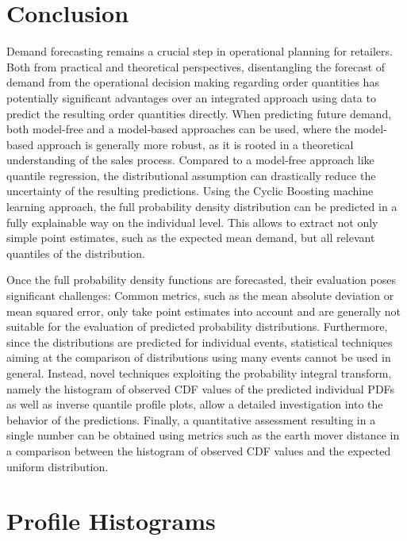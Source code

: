 \documentclass[BCOR=1mm, DIV=calc,10pt,
twoside=true,
twocolumn,
headings=normal]{scrartcl}
\begin{document}
\section{Conclusion}
Demand forecasting remains a crucial step in operational planning for retailers. Both from practical and theoretical perspectives, disentangling the forecast of demand from the operational decision making regarding order quantities has potentially significant advantages over an integrated approach using data to predict the resulting order quantities directly. When predicting future demand, both model-free and a model-based approaches can be used, where the model-based approach is generally more robust, as it is rooted in a theoretical understanding of the sales process. Compared to a model-free approach like quantile regression, the distributional assumption can drastically reduce the uncertainty of the resulting predictions. Using the Cyclic Boosting machine learning approach, the full probability density distribution can be predicted in a fully explainable way on the individual level. This allows to extract not only simple point estimates, such as the expected mean demand, but all relevant quantiles of the distribution.

Once the full probability density functions are forecasted, their evaluation poses significant challenges: Common metrics, such as the mean absolute deviation or mean squared error, only take point estimates into account and are generally not suitable for the evaluation of predicted probability distributions. Furthermore, since the distributions are predicted for individual events, statistical techniques aiming at the comparison of distributions using many events cannot be used in general. Instead, novel techniques exploiting the probability integral transform, namely the histogram of observed CDF values of the predicted individual PDFs as well as inverse quantile profile plots, allow a detailed investigation into the behavior of the predictions. Finally, a quantitative assessment resulting in a single number can be obtained using metrics such as the earth mover distance in a comparison between the histogram of observed CDF values and the expected uniform distribution.





\appendix

\section{Profile Histograms}
\label{sec:profile}
\end{document}
